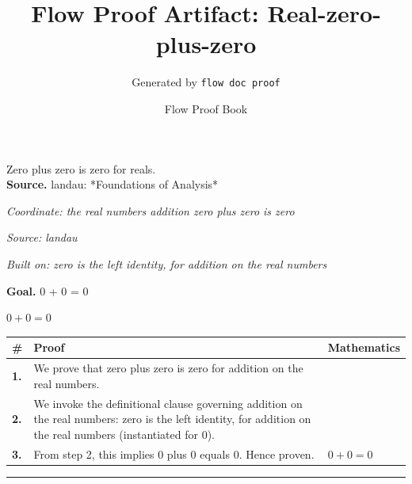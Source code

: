 \documentclass[11pt]{article}
\title{Flow Proof Artifact: Real-zero-plus-zero}
\author{Generated by \texttt{flow doc proof}}
\date{Flow Proof Book}
\theoremstyle{definition}
\begin{document}
\maketitle
Zero plus zero is zero for reals.\\[0.5em]
\textbf{Source.} landau: *Foundations of Analysis*\\[0.5em]
\bigskip
{}\par
\smallskip\noindent\textit{Coordinate: the real numbers \cdot addition \cdot zero plus zero is zero}\par
\smallskip\noindent\textit{Source: landau}\par
\smallskip\noindent\textit{Built on: zero is the left identity, for addition on the real numbers}\par
\medskip
\noindent\textbf{Goal.} 0 + 0 = 0\par
\noindent$\displaystyle 0 + 0 = 0$\par
\medskip
\noindent
\begin{tabular}{@{} >{\raggedright\arraybackslash}p{} >{\raggedright\arraybackslash}p{} >{\raggedleft\arraybackslash}p{} @{}}
\textbf{\#} & \textbf{Proof} & \textbf{Mathematics} \\
\midrule
\textbf{1.} & We prove that zero plus zero is zero for addition on the real numbers. & \\[0.45em]
\textbf{2.} & We invoke the definitional clause governing addition on the real numbers: zero is the left identity, for addition on the real numbers (instantiated for 0). & \\[0.45em]
\textbf{3.} & From step 2, this implies 0 plus 0 equals 0. Hence proven. & $\displaystyle 0 + 0 = 0$ \\[0.45em]
\bottomrule
\end{tabular}
\label{thm:Real-addition-zero_plus_zero_is_zero}
\par\medskip\hrule
\end{document}
